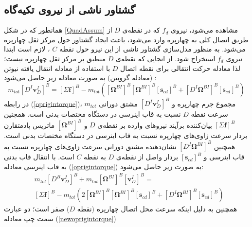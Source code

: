 \subsection{گشتاور ناشی از نیروی تكیه‌گاه}\label{sec:edgemoment}
همانطور که در شكل \ref{QuadAssum} مشاهده می‌شود، نیروی
$f_d$
که در نقطه‌ی 
$D$
از طریق اتصال کلی به چهارپره وارد می‌شود، باعث ایجاد گشتاور حول مرکز ثقل چهارپره می‌شود. به منظور مدل‌سازی گشتاور ناشی از این نیرو حول نقطه
$C$
، لازم است ابتدا نیروی
$f_d$
استخراج شود. از انجایی که نقطه‌ی
$D$
منطبق بر مرکز ثقل چهارپره نیست؛ لذا معادله حرکت انتقالی برای نقطه اتصال
$D$
با استفاده از معادله انتقال یافته نیوتن (معادله گروبین) به صورت معادله زیر حاصل می‌شود
\cite{zipfel2000modeling}
:
\begin{equation}\label{oprigintorque}
	m_{tot} \left[D^I\boldsymbol v_D^I\right]^B = 
	\left[\Sigma \boldsymbol f\right]^B-m_{tot}\left(
	\left[\boldsymbol \Omega^{BI}\right]^B
	\left[\boldsymbol\Omega^{BI}\right]^B
	\left[\boldsymbol s_{cd}\right]^B+
	\left[D^I\boldsymbol\Omega^{BI}\right]^B
	\left[\boldsymbol s_{cd}\right]^B
	\right)
\end{equation}
در رابطه
(\ref{oprigintorque})، 
$m_{tot}$
مجموع جرم چهارپره و 
$\left[D^I\boldsymbol v_D^I\right]^B$
مشتق دورانی سرعت نقطه
$D$
نسبت به قاب اینرسی در دستگاه مختصات بدنی است. همچنین
$\left[\Sigma \boldsymbol f\right]^B$
بیان‌کننده برآیند نیروهای وارده بر نقطه‌ی
$D$
و
$\left[\boldsymbol\Omega^{BI}\right]^B$
ماتریس پادمتقارن بردار سرعت زاوی‌های چهارپره نسبت به قاب اینرسی در دستگاه مختصات بدنی است. همچنین
$\left[D^I\boldsymbol \Omega^{BI}\right]^B$
نشان‌دهنده مشتق دورانی سرعت زاوی‌های چهارپره نسبت به قاب اینرسی و 
$\left[\boldsymbol s_{cd}\right]^B$
بردار واصل از نقطه‌ی
$D$
به نقطه
$C$
است. با انتقال قاب بدنی به قاب اینرسی معادله 
(\ref{oprigintorque})
به صورت زیر حاصل می‌شود:
\begin{equation}
\begin{split}\label{newoprigintorque}
	&m_{tot} \left[D^B\boldsymbol v_D^I\right]^B +
	m_{tot}\left[\boldsymbol\Omega^{BI}\right]^B
	\left[\boldsymbol v_D^{I}\right]^B = \\
	&\left[\Sigma \boldsymbol f\right]^B-m_{tot}\left(2
	\left[\boldsymbol\Omega^{BI}\right]^B
	\left[\boldsymbol\Omega^{BI}\right]^B
	\left[\boldsymbol s_{cd}\right]^B+
	\left[D^I\boldsymbol\Omega^{BI}\right]^B
	\left[\boldsymbol s_{cd}\right]^B
	\right)
\end{split}
\end{equation}
همچنین به دلیل اینكه سرعت محل اتصال چهارپره (نقطه
$D$)
صفر است؛ دو عبارت سمت چپ معادله
(\ref{newoprigintorque}) 
